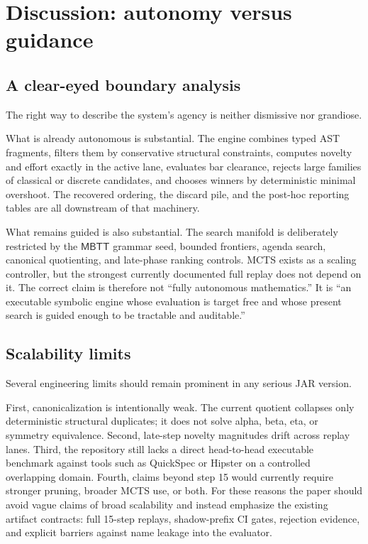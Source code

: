 \documentclass[pdflatex,sn-mathphys,Numbered]{sn-jnl}
\theoremstyle{thmstyleone}
\theoremstyle{thmstylethree}
\theoremstyle{thmstyletwo}
\newcommand{\MBTT}{\ensuremath{\mathsf{MBTT}}}
\begin{document}
\section{Discussion: autonomy versus guidance}\label{sec:discussion}

\subsection{A clear-eyed boundary analysis}

The right way to describe the system's agency is neither dismissive nor grandiose.

What is already autonomous is substantial. The engine combines typed AST fragments, filters them by conservative structural constraints, computes novelty and effort exactly in the active lane, evaluates bar clearance, rejects large families of classical or discrete candidates, and chooses winners by deterministic minimal overshoot. The recovered ordering, the discard pile, and the post-hoc reporting tables are all downstream of that machinery.

What remains guided is also substantial. The search manifold is deliberately restricted by the \MBTT{} grammar seed, bounded frontiers, agenda search, canonical quotienting, and late-phase ranking controls. MCTS exists as a scaling controller, but the strongest currently documented full replay does not depend on it. The correct claim is therefore not ``fully autonomous mathematics.'' It is ``an executable symbolic engine whose evaluation is target free and whose present search is guided enough to be tractable and auditable.''

\subsection{Scalability limits}

Several engineering limits should remain prominent in any serious JAR version.

First, canonicalization is intentionally weak. The current quotient collapses only deterministic structural duplicates; it does not solve alpha, beta, eta, or symmetry equivalence. Second, late-step novelty magnitudes drift across replay lanes. Third, the repository still lacks a direct head-to-head executable benchmark against tools such as QuickSpec or Hipster on a controlled overlapping domain. Fourth, claims beyond step 15 would currently require stronger pruning, broader MCTS use, or both. For these reasons the paper should avoid vague claims of broad scalability and instead emphasize the existing artifact contracts: full 15-step replays, shadow-prefix CI gates, rejection evidence, and explicit barriers against name leakage into the evaluator.
\end{document}
